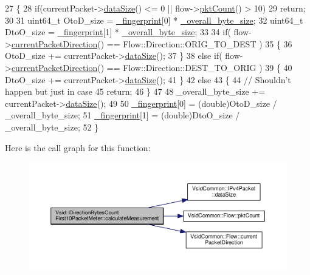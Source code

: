 \begin{DoxyCode}
27 \{
28     \textcolor{keywordflow}{if}(currentPacket->\hyperlink{class_vsid_common_1_1_i_pv4_packet_a39fe36210895625ee87320f5c0c7f52e}{dataSize}() <= 0 || flow->\hyperlink{class_vsid_common_1_1_flow_a41a3ebb168028d3cf0ea96b7e438ca89}{pktCount}() > 10)
29         \textcolor{keywordflow}{return};
30 
31     uint64\_t OtoD\_size = \hyperlink{class_vsid_1_1_attribute_meter_a0386b2fe9c5d6ab6fba16029d8da4efe}{\_fingerprint}[0] * \hyperlink{class_vsid_1_1_direction_bytes_count_first10_packet_meter_a38e8da3cb56886292cc89ed2911decce}{\_overall\_byte\_size};
32     uint64\_t DtoO\_size = \hyperlink{class_vsid_1_1_attribute_meter_a0386b2fe9c5d6ab6fba16029d8da4efe}{\_fingerprint}[1] * \hyperlink{class_vsid_1_1_direction_bytes_count_first10_packet_meter_a38e8da3cb56886292cc89ed2911decce}{\_overall\_byte\_size};
33 
34     \textcolor{keywordflow}{if}( flow->\hyperlink{class_vsid_common_1_1_flow_a0eb1c59e966ceb9ad6fee05d4c4784ad}{currentPacketDirection}() == Flow::Direction::ORIG\_TO\_DEST )
35     \{
36         OtoD\_size += currentPacket->\hyperlink{class_vsid_common_1_1_i_pv4_packet_a39fe36210895625ee87320f5c0c7f52e}{dataSize}();
37     \}
38     \textcolor{keywordflow}{else} \textcolor{keywordflow}{if}( flow->\hyperlink{class_vsid_common_1_1_flow_a0eb1c59e966ceb9ad6fee05d4c4784ad}{currentPacketDirection}() == Flow::Direction::DEST\_TO\_ORIG )
39     \{
40         DtoO\_size += currentPacket->\hyperlink{class_vsid_common_1_1_i_pv4_packet_a39fe36210895625ee87320f5c0c7f52e}{dataSize}();
41     \}
42     \textcolor{keywordflow}{else}
43     \{
44         \textcolor{comment}{// Shouldn't happen but just in case}
45         \textcolor{keywordflow}{return};
46     \}
47 
48     \_overall\_byte\_size += currentPacket->\hyperlink{class_vsid_common_1_1_i_pv4_packet_a39fe36210895625ee87320f5c0c7f52e}{dataSize}();
49 
50     \hyperlink{class_vsid_1_1_attribute_meter_a0386b2fe9c5d6ab6fba16029d8da4efe}{\_fingerprint}[0] = (double)OtoD\_size / \_overall\_byte\_size;
51     \hyperlink{class_vsid_1_1_attribute_meter_a0386b2fe9c5d6ab6fba16029d8da4efe}{\_fingerprint}[1] = (double)DtoO\_size / \_overall\_byte\_size;
52 \}\end{DoxyCode}


Here is the call graph for this function\-:
\nopagebreak
\begin{figure}[H]
\begin{center}
\leavevmode
\includegraphics[width=350pt]{class_vsid_1_1_direction_bytes_count_first10_packet_meter_a72110bee456d1160a70db709bd507d30_cgraph}
\end{center}
\end{figure}


